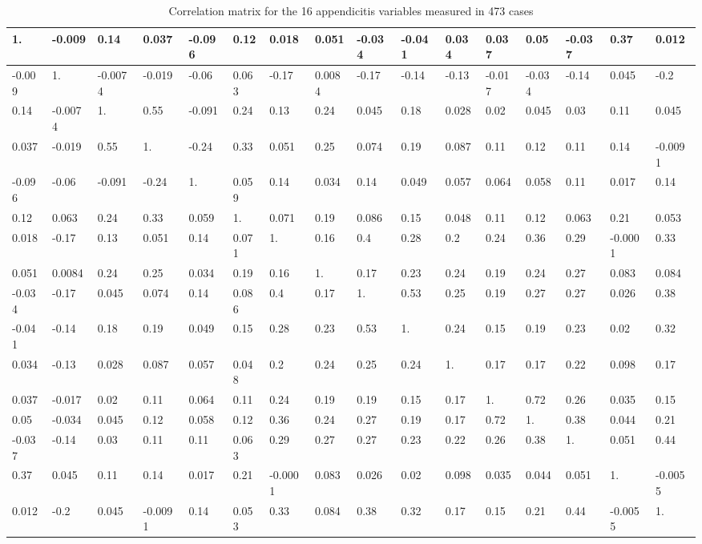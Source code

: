 \documentclass[10pt]{book}
\begin{document}
\begin{table}[htbp]
\centering
\caption{Correlation matrix for the 16 appendicitis variables measured in 473 cases}
\begin{tabular}{|l|l|l|l|l|l|l|l|l|l|l|l|l|l|l|l|}
\hline
1. & -0.009 & 0.14 & 0.037 & -0.096 & 0.12 & 0.018 & 0.051 & -0.034 & -0.041 & 0.034 & 0.037 & 0.05 & -0.037 & 0.37 & 0.012 \\
\hline
-0.009 & 1. & -0.0074 & -0.019 & -0.06 & 0.063 & -0.17 & 0.0084 & -0.17 & -0.14 & -0.13 & -0.017 & -0.034 & -0.14 & 0.045 & -0.2 \\
\hline
0.14 & -0.0074 & 1. & 0.55 & -0.091 & 0.24 & 0.13 & 0.24 & 0.045 & 0.18 & 0.028 & 0.02 & 0.045 & 0.03 & 0.11 & 0.045 \\
\hline
0.037 & -0.019 & 0.55 & 1. & -0.24 & 0.33 & 0.051 & 0.25 & 0.074 & 0.19 & 0.087 & 0.11 & 0.12 & 0.11 & 0.14 & -0.0091 \\
\hline
-0.096 & -0.06 & -0.091 & -0.24 & 1. & 0.059 & 0.14 & 0.034 & 0.14 & 0.049 & 0.057 & 0.064 & 0.058 & 0.11 & 0.017 & 0.14 \\
\hline
0.12 & 0.063 & 0.24 & 0.33 & 0.059 & 1. & 0.071 & 0.19 & 0.086 & 0.15 & 0.048 & 0.11 & 0.12 & 0.063 & 0.21 & 0.053 \\
\hline
0.018 & -0.17 & 0.13 & 0.051 & 0.14 & 0.071 & 1. & 0.16 & 0.4 & 0.28 & 0.2 & 0.24 & 0.36 & 0.29 & -0.0001 & 0.33 \\
\hline
0.051 & 0.0084 & 0.24 & 0.25 & 0.034 & 0.19 & 0.16 & 1. & 0.17 & 0.23 & 0.24 & 0.19 & 0.24 & 0.27 & 0.083 & 0.084 \\
\hline
-0.034 & -0.17 & 0.045 & 0.074 & 0.14 & 0.086 & 0.4 & 0.17 & 1. & 0.53 & 0.25 & 0.19 & 0.27 & 0.27 & 0.026 & 0.38 \\
\hline
-0.041 & -0.14 & 0.18 & 0.19 & 0.049 & 0.15 & 0.28 & 0.23 & 0.53 & 1. & 0.24 & 0.15 & 0.19 & 0.23 & 0.02 & 0.32 \\
\hline
0.034 & -0.13 & 0.028 & 0.087 & 0.057 & 0.048 & 0.2 & 0.24 & 0.25 & 0.24 & 1. & 0.17 & 0.17 & 0.22 & 0.098 & 0.17 \\
\hline
0.037 & -0.017 & 0.02 & 0.11 & 0.064 & 0.11 & 0.24 & 0.19 & 0.19 & 0.15 & 0.17 & 1. & 0.72 & 0.26 & 0.035 & 0.15 \\
\hline
0.05 & -0.034 & 0.045 & 0.12 & 0.058 & 0.12 & 0.36 & 0.24 & 0.27 & 0.19 & 0.17 & 0.72 & 1. & 0.38 & 0.044 & 0.21 \\
\hline
-0.037 & -0.14 & 0.03 & 0.11 & 0.11 & 0.063 & 0.29 & 0.27 & 0.27 & 0.23 & 0.22 & 0.26 & 0.38 & 1. & 0.051 & 0.44 \\
\hline
0.37 & 0.045 & 0.11 & 0.14 & 0.017 & 0.21 & -0.0001 & 0.083 & 0.026 & 0.02 & 0.098 & 0.035 & 0.044 & 0.051 & 1. & -0.0055 \\
\hline
0.012 & -0.2 & 0.045 & -0.0091 & 0.14 & 0.053 & 0.33 & 0.084 & 0.38 & 0.32 & 0.17 & 0.15 & 0.21 & 0.44 & -0.0055 & 1. \\
\hline
\end{tabular}
\end{table}
\end{document}
